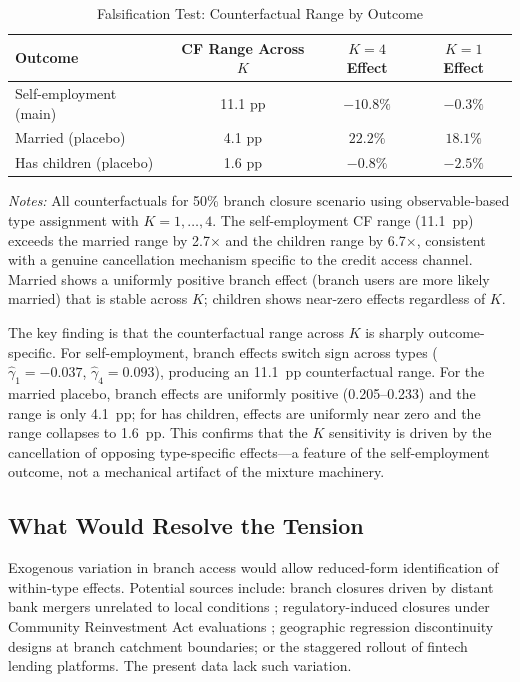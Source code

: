 \documentclass[12pt]{article}
\begin{document}
\begin{table}[H]
\centering
\caption{Falsification Test: Counterfactual Range by Outcome}
\label{tab:falsification}
\begin{threeparttable}
\begin{tabular}{lccc}
\toprule
Outcome & CF Range Across $K$ & $K=4$ Effect & $K=1$ Effect \\
\midrule
Self-employment (main) & 11.1 pp & $-10.8\%$ & $-0.3\%$ \\
Married (placebo) & 4.1 pp & $22.2\%$ & $18.1\%$ \\
Has children (placebo) & 1.6 pp & $-0.8\%$ & $-2.5\%$ \\
\bottomrule
\end{tabular}
\begin{tablenotes}
\small
\item \textit{Notes:} All counterfactuals for 50\% branch closure scenario using observable-based type assignment with $K = 1, \ldots, 4$. The self-employment CF range (11.1~pp) exceeds the married range by 2.7$\times$ and the children range by 6.7$\times$, consistent with a genuine cancellation mechanism specific to the credit access channel. Married shows a uniformly positive branch effect (branch users are more likely married) that is stable across $K$; children shows near-zero effects regardless of $K$.
\end{tablenotes}
\end{threeparttable}
\end{table}


The key finding is that the counterfactual range across $K$ is sharply outcome-specific.  For self-employment, branch effects switch sign across types ($\hat{\gamma}_1 = -0.037$, $\hat{\gamma}_4 = 0.093$), producing an 11.1~pp counterfactual range. For the married placebo, branch effects are uniformly positive (0.205--0.233) and the range is only 4.1~pp; for has children, effects are uniformly near zero and the range collapses to 1.6~pp. This confirms that the $K$ sensitivity is driven by the cancellation of opposing type-specific effects---a feature of the self-employment outcome, not a mechanical artifact of the mixture machinery.

\subsection{What Would Resolve the Tension}

Exogenous variation in branch access would allow reduced-form identification of within-type effects. Potential sources include: branch closures driven by distant bank mergers unrelated to local conditions \citep{nguyen2019}; regulatory-induced closures under Community Reinvestment Act evaluations \citep{celerier2019}; geographic regression discontinuity designs at branch catchment boundaries; or the staggered rollout of fintech lending platforms. The present data lack such variation.
\end{document}
